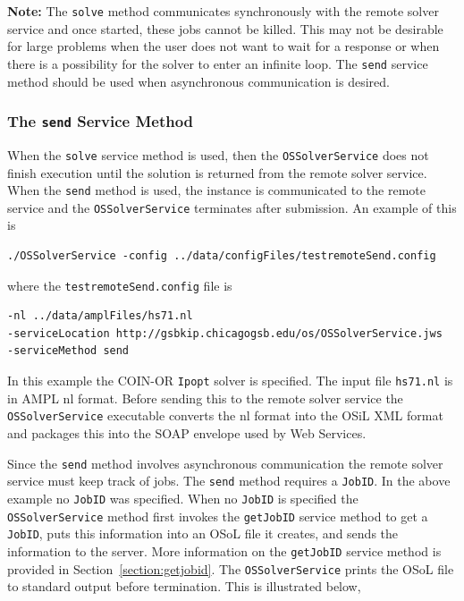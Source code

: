 \documentclass[11pt]{article}
\renewcommand{\_}{{\char"5F}}
\renewcommand{\{}{{\char"7B}}
\renewcommand{\}}{{\char"7D}}
\renewcommand{\^}{{\char"0D}}
\renewcommand{\'}{{\char"0D}}
\begin{document}
\begin{enumerate}[Step 1:]
{\bf Note:} The {\tt solve} method communicates synchronously with the remote solver service
and once started, these jobs cannot be killed. This may not be desirable for large
problems when the user does not want to wait for a response or when there is a possibility
for the solver to enter an infinite loop. The {\tt send} service
method should be used when asynchronous communication is desired.


\subsubsection{The  {\tt send} Service Method}\label{section:send}

When the {\tt solve} service method is used, then the {\tt OSSolverService} does not
finish execution until the solution is returned from the remote solver service.
 When the {\tt send}
method is used, the instance is communicated to the remote service and the
{\tt OSSolverService} terminates after submission. An example of this is
\begin{verbatim}
./OSSolverService -config ../data/configFiles/testremoteSend.config
\end{verbatim}
where the {\tt testremoteSend.config} file is
\begin{verbatim}
-nl ../data/amplFiles/hs71.nl
-serviceLocation http://gsbkip.chicagogsb.edu/os/OSSolverService.jws
-serviceMethod send
\end{verbatim}
In this example the COIN-OR {\tt Ipopt} solver is specified. The input file {\tt hs71.nl}
is in AMPL nl format.
Before sending this to the remote solver service the {\tt OSSolverService} executable converts  
the nl format into the OSiL XML format and packages this 
into the SOAP envelope used by Web Services.

Since the {\tt send} method involves asynchronous communication the remote solver service must keep track of jobs.
The {\tt send} method requires a {\tt JobID}. In the above example no {\tt JobID} was specified.
When no {\tt JobID} is specified the {\tt OSSolverService} method first invokes the {\tt getJobID} service method
to get a {\tt JobID}, puts this information into an OSoL file it creates, and sends the information
to the server. More information on the {\tt getJobID} service method is provided in Section~\ref{section:getjobid}.
The {\tt OSSolverService} prints the OSoL file to standard output before termination.
This is illustrated below,


\end{enumerate}
\end{document}
